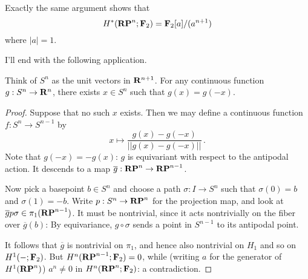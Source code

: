 \begin{example}
Exactly the same argument shows that
\begin{equation*}
H^\ast(\mathbf{RP}^n;\mathbf F_2)=\mathbf F_2[a]/(a^{n+1})
\end{equation*}
where $|a|=1$. 
\end{example}
I'll end with the following application.
\begin{theorem}
Think of $S^n$ as the unit vectors in $\mathbf R^{n+1}$. 
For any continuous function $g:S^n\to\mathbf R^n$, there exists $x\in S^n$
such that $g(x)=g(-x)$.
\end{theorem}
\begin{proof} Suppose that no such $x$ exists. Then we may define
a continuous function $f:S^n\to S^{n-1}$ by 
\[
x\mapsto\frac{g(x)-g(-x)}{||g(x)-g(-x)||}\,.
\]
Note that $g(-x)=-g(x)$: $g$ is equivariant with respect to the antipodal 
action. It descends to a map $\overline g:\mathbf{RP}^n\to\mathbf{RP}^{n-1}$.

Now pick a basepoint $b\in S^n$ and choose a path $\sigma:I\to S^n$ 
such that $\sigma(0)=b$ and $\sigma(1)=-b$. 
Write $p:S^n\to\mathbf{RP}^n$ for the projection map, and look at 
$\overline gp\sigma\in\pi_1(\mathbf{RP}^{n-1})$. It must be nontrivial,
since it acts nontrivially on the fiber over $\overline g(b)$:
By equivariance, 
$g\circ\sigma$ sends a point in $S^{n-1}$ to its antipodal point. 

It follows that $\overline g$ is nontrivial on $\pi_1$, and hence also
nontrivial on $H_1$ and so on $H^1(-;\mathbf F_2)$. But $H^n(\mathbf{RP}^{n-1};\mathbf F_2)=0$, 
while (writing $a$ for the generator of $H^1(\mathbf{RP}^n)$) $a^n\neq0$ in 
$H^n(\mathbf{RP}^n;\mathbf F_2)$: a contradiction.
\end{proof}
